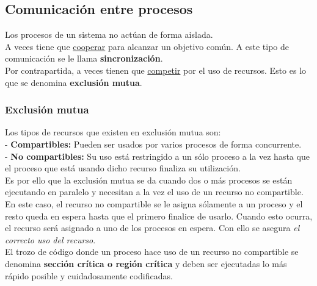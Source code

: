 \documentclass[spanish, 12pt]{article}
\begin{document}
				\newpage
				
		\subsection{Comunicación entre procesos}
		
			Los procesos de un sistema no actúan de forma aislada.\\
			
			A veces tiene que \underline{cooperar} para alcanzar un objetivo común. A este tipo de comunicación se le llama \textbf{sincronización}.\\
			
			Por contrapartida, a veces tienen que \underline{competir} por el uso de recursos. Esto es lo que se denomina \textbf{exclusión mutua}.\\
			
			\subsubsection{Exclusión mutua}
			
				Los tipos de recursos que existen en exclusión mutua son:\\
			
				- \textbf{Compartibles:} Pueden ser usados por varios procesos de forma concurrente.\\
			
				- \textbf{No compartibles:} Su uso está restringido a un sólo proceso a la vez hasta que el proceso que está usando dicho recurso finaliza su utilización.\\
			
				Es por ello que la exclusión mutua se da cuando dos o más procesos se están ejecutando en paralelo y necesitan a la vez el uso de un recurso no compartible.\\
			
				En este caso, el recurso no compartible se le asigna sólamente a un proceso y el resto queda en espera hasta que el primero finalice de usarlo. Cuando esto ocurra, el recurso será asignado a uno de los procesos en espera. Con ello se asegura \textit{el correcto uso del recurso}.\\
			
				El trozo de código donde un proceso hace uso de un recurso no compartible se denomina \textbf{sección crítica o región crítica} y deben ser ejecutadas lo más rápido posible y cuidadosamente codificadas.\\
				
\end{document}
